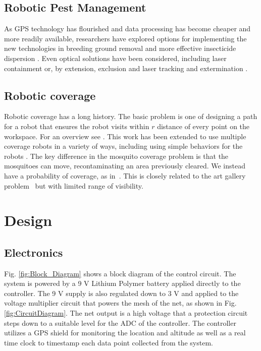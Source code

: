 \documentclass[letterpaper, 10 pt, conference]{ieeeconf}  %
\begin{document}
    \subsection{Robotic Pest Management}
    
As GPS technology has flourished and data processing has become cheaper and more readily available, researchers have explored options for implementing the new technologies in breeding ground removal \cite{anupa2014identification} and more effective insecticide dispersion \cite{hur2015low}.  Even optical solutions have been considered, including laser containment \cite{boonsri2012laser} or, by extension, exclusion and laser tracking and extermination \cite{kare2010build}.
    
    \subsection{Robotic coverage}
    Robotic coverage has a long history. The basic problem is one of designing a path for a robot that ensures the robot visits within $r$ distance of every point on the workspace.  For an overview see \cite{Choset2001}.  This work has been extended to use multiple coverage robots in a variety of ways, including using simple behaviors for the robots \cite{spears2006physics,Koenig2001}.
    The key difference in the mosquito coverage problem is that the mosquitoes can move, recontaminating an area previously cleared. We instead have a probability of coverage, as in~\cite{Das2011}.  This is closely related to the art gallery problem~\cite{lee1986computational} but with limited range of visibility.
    
    
  
  \section{Design}
  
  

  
   \subsection{Electronics}
   
Fig. \ref{fig:Block_Diagram} shows a block diagram of the control circuit.  The system is powered by a 9 V Lithium Polymer battery applied directly to the controller. The 9 V supply is also regulated down to 3 V and applied to the voltage multiplier circuit that powers the mesh of the net, as shown in Fig. \ref{fig:CircuitDiagram}. The net output is a high voltage that a protection circuit steps down to a suitable level for the ADC of the controller. The controller utilizes a GPS shield for monitoring the location and altitude as well as a real time clock to timestamp each data point collected from the system.     
\end{document}
